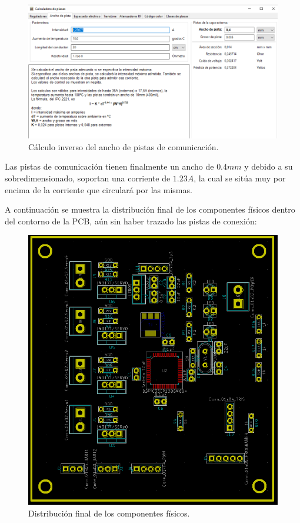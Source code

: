 \begin{figure}[H]
\centering 
\includegraphics[width=0.9\linewidth]{pictures/AnchoPistaResto.PNG}
\caption{Cálculo inverso del ancho de pistas de comunicación.}
\label{fig:CAMBIAR!!!!!!!!!!}
\end{figure}

Las pistas de comunicación tienen finalmente un ancho de $0.4mm$ y debido a su sobredimensionado, soportan una corriente de $1.23A$, la cual se sitúa muy por encima de la corriente que circulará por las mismas.

A continuación se muestra la distribución final de los componentes físicos dentro del contorno de la \ac{PCB}, aún sin haber trazado las pistas de conexión:

\begin{figure}[H]
\centering
\includegraphics[width=0.9\linewidth]{pictures/DistribucionFinal.PNG}
\caption{Distribución final de los componentes físicos.}
\label{fig:CAMBIAR!!!!!!!!!!}
\end{figure}

